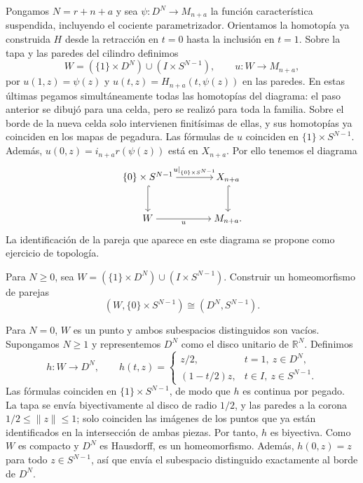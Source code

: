 Pongamos $N=r+n+a$ y sea $\psi\colon D^N\to M_{n+a}$ la función característica suspendida, incluyendo el cociente parametrizador. Orientamos la homotopía ya construida $H$ desde la retracción en $t=0$ hasta la inclusión en $t=1$. Sobre la tapa y las paredes del cilindro definimos
\[
W=(\{1\}\times D^N)\cup(I\times S^{N-1}),\qquad
u\colon W\longrightarrow M_{n+a},
\]
por $u(1,z)=\psi(z)$ y $u(t,z)=H_{n+a}(t,\psi(z))$ en las paredes. En estas últimas pegamos simultáneamente todas las homotopías del diagrama: el paso anterior se dibujó para una celda, pero se realizó para toda la familia. Sobre el borde de la nueva celda solo intervienen finitísimas de ellas, y sus homotopías ya coinciden en los mapas de pegadura. Las fórmulas de $u$ coinciden en $\{1\}\times S^{N-1}$. Además, $u(0,z)=i_{n+a}r(\psi(z))$ está en $X_{n+a}$. Por ello tenemos el diagrama
\[
\begin{tikzcd}[cramped,column sep=large,row sep=large]
\{0\}\times S^{N-1} \arrow[r,"u|_{\{0\}\times S^{N-1}}"] \arrow[d,hook]
& X_{n+a} \arrow[d,hook]\\
W \arrow[r,"u"'] & M_{n+a}.
\end{tikzcd}
\]
La identificación de la pareja que aparece en este diagrama se propone como ejercicio de topología.

\begin{ejer}\label{ejer:c12-tapa-paredes}
Para $N\ge0$, sea $W=(\{1\}\times D^N)\cup(I\times S^{N-1})$. Construir un homeomorfismo de parejas
\[
(W,\{0\}\times S^{N-1})\cong(D^N,S^{N-1}).
\]
\end{ejer}
\begin{sol}
Para $N=0$, $W$ es un punto y ambos subespacios distinguidos son vacíos. Supongamos $N\ge1$ y representemos $D^N$ como el disco unitario de $\mathbb R^N$. Definimos
\[
h\colon W\longrightarrow D^N,\qquad
h(t,z)=
\begin{cases}
z/2,&t=1,\ z\in D^N,\\
(1-t/2)z,&t\in I,\ z\in S^{N-1}.
\end{cases}
\]
Las fórmulas coinciden en $\{1\}\times S^{N-1}$, de modo que $h$ es continua por pegado. La tapa se envía biyectivamente al disco de radio $1/2$, y las paredes a la corona $1/2\le\lVert z\rVert\le1$; solo coinciden las imágenes de los puntos que ya están identificados en la intersección de ambas piezas. Por tanto, $h$ es biyectiva. Como $W$ es compacto y $D^N$ es Hausdorff, es un homeomorfismo. Además, $h(0,z)=z$ para todo $z\in S^{N-1}$, así que envía el subespacio distinguido exactamente al borde de $D^N$.
\end{sol}

